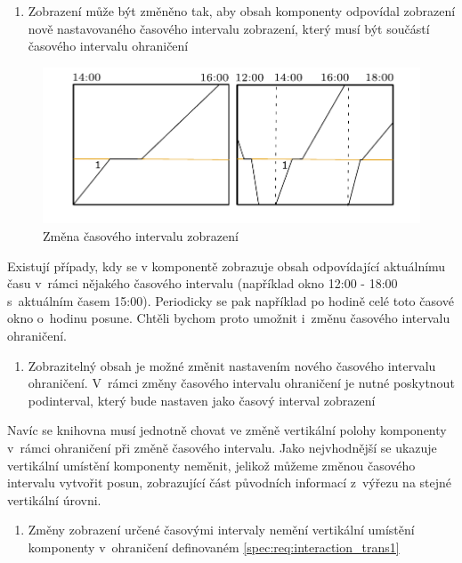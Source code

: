 \begin{enumerate}[label=\color{reqcolor}\textbf{R{\arabic*}},resume]
	\item \label{spec:req:time_mod1} Zobrazení může být změněno tak, aby obsah komponenty odpovídal zobrazení nově nastavovaného časového intervalu zobrazení, který musí být součástí časového intervalu ohraničení
\end{enumerate}

\begin{figure}[!htb]
	\centering					
	\includegraphics[width=\textwidth]{../img/kap2_time_interval_change}
	\caption{Změna časového intervalu zobrazení}
	\label{fig:spec:zmena_casoveho_intervalu_zobrazeni}
\end{figure}

Existují případy, kdy se v komponentě zobrazuje obsah odpovídající aktuálnímu času v~rámci nějakého časového intervalu (například okno 12:00 - 18:00 s~aktuálním časem 15:00). Periodicky se pak například po hodině celé toto časové okno o~hodinu posune. Chtěli bychom proto umožnit i~změnu časového intervalu ohraničení.

\begin{enumerate}[label=\color{reqcolor}\textbf{R{\arabic*}},resume]
	\item \label{spec:req:time_mod2} Zobrazitelný obsah je možné změnit nastavením nového časového intervalu ohraničení. V~rámci změny časového intervalu ohraničení je nutné poskytnout podinterval, který bude nastaven jako časový interval zobrazení
\end{enumerate}

Navíc se knihovna musí jednotně chovat ve změně vertikální polohy komponenty v~rámci ohraničení při změně časového intervalu. Jako nejvhodnější se ukazuje vertikální umístění komponenty neměnit, jelikož můžeme změnou časového intervalu vytvořit posun, zobrazující část původních informací z~výřezu na stejné vertikální úrovni.

\begin{enumerate}[label=\color{reqcolor}\textbf{R{\arabic*}},resume]
	\item \label{spec:req:time_mod3} Změny zobrazení určené časovými intervaly nemění vertikální umístění komponenty v~ohraničení definovaném \ref{spec:req:interaction_trans1}
\end{enumerate}

